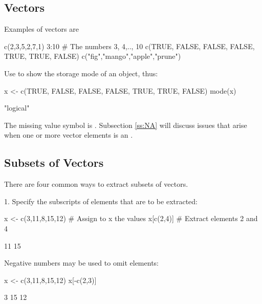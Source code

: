 \subsection{Vectors}\label{ss:vector}
Examples of vectors  are
\begin{Schunk}
\begin{Sinput}
c(2,3,5,2,7,1)
3:10 # The numbers 3, 4,.., 10
c(TRUE, FALSE, FALSE, FALSE, TRUE, TRUE, FALSE)
c("fig","mango","apple","prune")
\end{Sinput}
\end{Schunk}

Use  to show the storage mode of an object, thus:
\begin{Schunk}
\begin{Sinput}
x <- c(TRUE, FALSE, FALSE, FALSE, TRUE, TRUE, FALSE)
mode(x)
\end{Sinput}
\begin{Soutput}
[1] "logical"
\end{Soutput}
\end{Schunk}

The missing value symbol is .  Subsection \ref{ss:NA} will
discuss issues that arise when one or more vector elements is an .

\subsection*{Subsets of Vectors}
There are four common ways to extract subsets of vectors.

1. Specify the subscripts of elements that are to be extracted:
\begin{Schunk}
\begin{Sinput}
x <- c(3,11,8,15,12)   # Assign to x the values
x[c(2,4)]              # Extract elements 2 and 4
\end{Sinput}
\begin{Soutput}
[1] 11 15
\end{Soutput}
\end{Schunk}
\noindent
Negative numbers may be used to omit elements:
\begin{Schunk}
\begin{Sinput}
x <- c(3,11,8,15,12)
x[-c(2,3)]
\end{Sinput}
\begin{Soutput}
[1]  3 15 12
\end{Soutput}
\end{Schunk}

